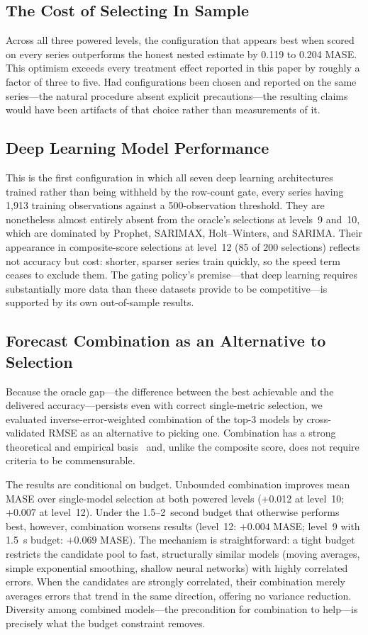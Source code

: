 \subsection{The Cost of Selecting In Sample}
Across all three powered levels, the configuration that appears best when scored on every series outperforms the honest nested estimate by 0.119 to 0.204 MASE. This optimism exceeds every treatment effect reported in this paper by roughly a factor of three to five. Had configurations been chosen and reported on the same series---the natural procedure absent explicit precautions---the resulting claims would have been artifacts of that choice rather than measurements of it.

\subsection{Deep Learning Model Performance}
This is the first configuration in which all seven deep learning architectures trained rather than being withheld by the row-count gate, every series having 1{,}913 training observations against a 500-observation threshold. They are nonetheless almost entirely absent from the oracle's selections at levels~9 and~10, which are dominated by Prophet, SARIMAX, Holt--Winters, and SARIMA. Their appearance in composite-score selections at level~12 (85 of 200 selections) reflects not accuracy but cost: shorter, sparser series train quickly, so the speed term ceases to exclude them. The gating policy's premise---that deep learning requires substantially more data than these datasets provide to be competitive---is supported by its own out-of-sample results.

\subsection{Forecast Combination as an Alternative to Selection}
Because the oracle gap---the difference between the best achievable and the delivered accuracy---persists even with correct single-metric selection, we evaluated inverse-error-weighted combination of the top-3 models by cross-validated RMSE as an alternative to picking one. Combination has a strong theoretical and empirical basis~\cite{bates1969combination,timmermann2006forecast} and, unlike the composite score, does not require criteria to be commensurable.

The results are conditional on budget. Unbounded combination improves mean MASE over single-model selection at both powered levels (+0.012 at level~10; +0.007 at level~12). Under the 1.5--2~second budget that otherwise performs best, however, combination worsens results (level~12: $+0.004$ MASE; level~9 with 1.5~s budget: $+0.069$ MASE). The mechanism is straightforward: a tight budget restricts the candidate pool to fast, structurally similar models (moving averages, simple exponential smoothing, shallow neural networks) with highly correlated errors. When the candidates are strongly correlated, their combination merely averages errors that trend in the same direction, offering no variance reduction. Diversity among combined models---the precondition for combination to help---is precisely what the budget constraint removes.

